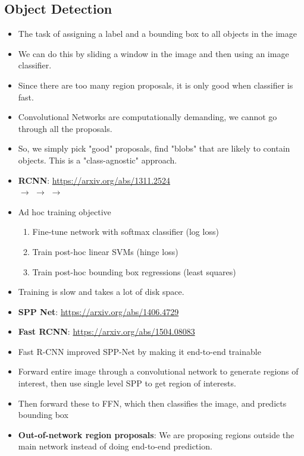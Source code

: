 \documentclass[a4paper]{article}
\begin{document}
\subsection{Object Detection}
\begin{itemize}
    \item The task of assigning a label and a bounding box to all objects in the image
    \item We can do this by sliding a window in the image and then using an image classifier.
    \item Since there are too many region proposals, it is only good when classifier is fast.
    \item Convolutional Networks are computationally demanding, we cannot go through all the proposals.
    \item So, we simply pick "good" proposals, find "blobs" that are likely to contain objects. This is a "class-agnostic" approach.
    \item \textbf{RCNN}: \url{https://arxiv.org/abs/1311.2524}\\
     $\to$  $\to$  $\to$ 
    \item Ad hoc training objective
    \begin{enumerate}
        \item Fine-tune network with softmax classifier (log loss)
        \item Train post-hoc linear SVMs (hinge loss)
        \item Train post-hoc bounding box regressions (least squares)
    \end{enumerate}
    \item Training is slow and takes a lot of disk space.
    \item \textbf{SPP Net}: \url{https://arxiv.org/abs/1406.4729}
    \item \textbf{Fast RCNN}: \url{https://arxiv.org/abs/1504.08083}
    \item Fast R-CNN improved SPP-Net by making it end-to-end trainable
    \item Forward entire image through a convolutional network to generate regions of interest, then use single level SPP to get region of interests.
    \item Then forward these to FFN, which then classifies the image, and predicts bounding box
    \item \textbf{Out-of-network region proposals}: We are proposing regions outside the main network instead of doing end-to-end prediction.

\end{itemize}
\end{document}
